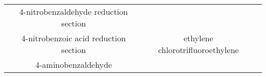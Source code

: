 \begin{table}[H]
\begin{tabular}{@{}lcccl@{}}
                                                      & 4-nitrobenzaldehyde reduction section                    &                                                                                               &                                                    &                                                                                                                                                                                                                                                                                                                                                                                                                                                                                                                                                                                                                                                                                                                                                                                                                                                                                                                                                     \\
& 4-nitrobenzoic acid reduction section                    &                                                                     & \multirow{-3}{*}{ethylene chlorotrifluoroethylene} & \\
                                                      & \cellcolor[HTML]{FFF}4-aminobenzaldehyde                 &                                                                                               &                                                    &                                                                                                                                                                                                                                                                                                                                                                                                                                                                                                                                                                                                                                                                                                                                                                                                                                                                                                                                                     \\

\end{tabular}
\end{table}
